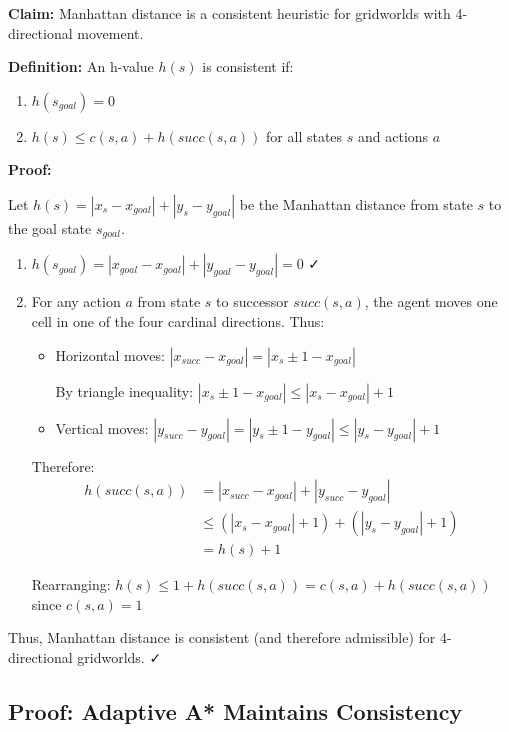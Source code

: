 \documentclass[12pt]{article}
\begin{document}
\textbf{Claim:} Manhattan distance is a consistent heuristic for gridworlds with 4-directional 
movement.

\textbf{Definition:} An h-value $h(s)$ is consistent if:
\begin{enumerate}
    \item $h(s_{goal}) = 0$
    \item $h(s) \leq c(s,a) + h(succ(s,a))$ for all states $s$ and actions $a$
\end{enumerate}

\textbf{Proof:}

Let $h(s) = |x_s - x_{goal}| + |y_s - y_{goal}|$ be the Manhattan distance from state $s$ to 
the goal state $s_{goal}$.

\begin{enumerate}
    \item $h(s_{goal}) = |x_{goal} - x_{goal}| + |y_{goal} - y_{goal}| = 0$ ✓
    
    \item For any action $a$ from state $s$ to successor $succ(s,a)$, the agent moves one cell 
    in one of the four cardinal directions. Thus:
    \begin{itemize}
        \item Horizontal moves: $|x_{succ} - x_{goal}| = |x_s \pm 1 - x_{goal}|$
        
        By triangle inequality: $|x_s \pm 1 - x_{goal}| \leq |x_s - x_{goal}| + 1$
        
        \item Vertical moves: $|y_{succ} - y_{goal}| = |y_s \pm 1 - y_{goal}| \leq |y_s - y_{goal}| + 1$
    \end{itemize}
    
    Therefore:
    \begin{align*}
    h(succ(s,a)) &= |x_{succ} - x_{goal}| + |y_{succ} - y_{goal}| \\
    &\leq (|x_s - x_{goal}| + 1) + (|y_s - y_{goal}| + 1) \\
    &= h(s) + 1
    \end{align*}
    
    Rearranging: $h(s) \leq 1 + h(succ(s,a)) = c(s,a) + h(succ(s,a))$ since $c(s,a) = 1$
\end{enumerate}

Thus, Manhattan distance is consistent (and therefore admissible) for 4-directional gridworlds. ✓


\subsection{Proof: Adaptive A* Maintains Consistency}
\end{document}

